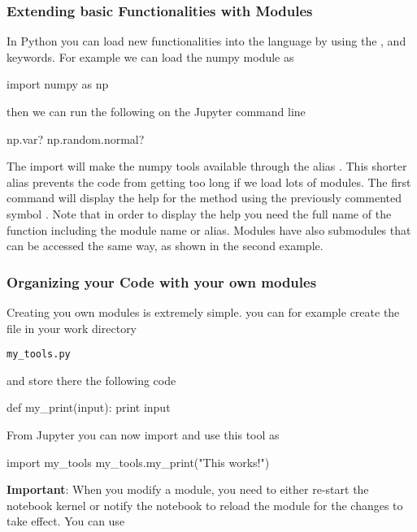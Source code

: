 \subsubsection{Extending basic Functionalities with Modules}

In Python you can load new functionalities into the language by using the
,  and  keywords. For example we can load the
numpy module as

\begin{python}
import numpy as np
\end{python}

\noindent then we can run the following on the Jupyter command line

\begin{python}
np.var?
np.random.normal?
\end{python}

The import will make the numpy tools available through the alias .  This shorter alias prevents the code from getting too long if we load lots of modules. The first command will display the help for the method  using the previously commented symbol . Note that in order to display the help you need the full name of the function including the module name or alias. Modules have also submodules that can be accessed the same way, as shown in the second example.

\subsubsection{Organizing your Code with your own modules}

Creating you own modules is extremely simple. you can for example create the
file in your work directory

\begin{verbatim}
my_tools.py
\end{verbatim}

\noindent and store there the following code 

\begin{python}
def my_print(input):
    print input
\end{python}

From Jupyter you can now import and use this tool as

\begin{python}
import my_tools
my_tools.my_print("This works!") 
\end{python}

\textbf{Important}: When you modify a module, you need to either re-start the notebook kernel or notify the notebook to reload the module for the changes to take effect. You can use

